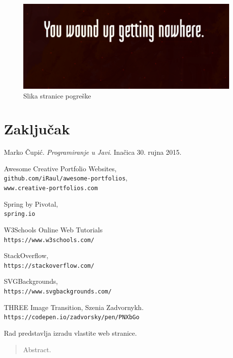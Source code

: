 \documentclass[times, utf8, zavrsni, numeric]{fer}
\begin{document}
\begin{figure}[htb]
				\centering
				\includegraphics[width=14.6cm]{images/error.png}
				\caption{Slika stranice pogreške}
				\label{fig:error}
\end{figure}

\chapter{Zaključak}



\begin{thebibliography}{9}
				Marko Čupić.
				\textit{Programiranje u Javi}.
				Inačica 30. rujna 2015.

				Awesome Creative Portfolio Websites,
				\\\texttt{github.com/iRaul/awesome-portfolios},
				\\\texttt{www.creative-portfolios.com}

				Spring by Pivotal,
				\\\texttt{spring.io}

				W3Schools Online Web Tutorials
				\\\texttt{https://www.w3schools.com/}

				StackOverflow,
				\\\texttt{https://stackoverflow.com/}

				SVGBackgrounds,
				\\\texttt{https://www.svgbackgrounds.com/}

				THREE Image Transition,
				Szenia Zadvornykh.
				\texttt{https://codepen.io/zadvorsky/pen/PNXbGo}
\end{thebibliography}

\begin{sazetak}
\qquad Rad predstavlja izradu vlastite web stranice.

\end{sazetak}

\begin{abstract}
Abstract.

\end{abstract}
\end{document}
